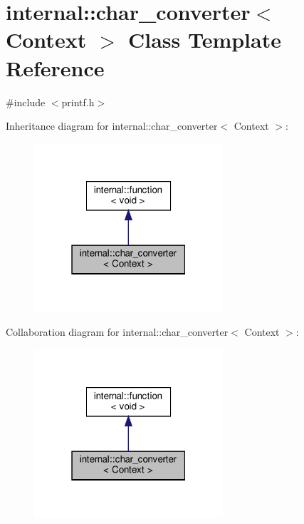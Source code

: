 \hypertarget{classinternal_1_1char__converter}{}\section{internal\+:\+:char\+\_\+converter$<$ Context $>$ Class Template Reference}
\label{classinternal_1_1char__converter}


{\ttfamily \#include $<$printf.\+h$>$}



Inheritance diagram for internal\+:\+:char\+\_\+converter$<$ Context $>$\+:
\nopagebreak
\begin{figure}[H]
\begin{center}
\leavevmode
\includegraphics[width=199pt]{classinternal_1_1char__converter__inherit__graph}
\end{center}
\end{figure}


Collaboration diagram for internal\+:\+:char\+\_\+converter$<$ Context $>$\+:
\nopagebreak
\begin{figure}[H]
\begin{center}
\leavevmode
\includegraphics[width=199pt]{classinternal_1_1char__converter__coll__graph}
\end{center}
\end{figure}
